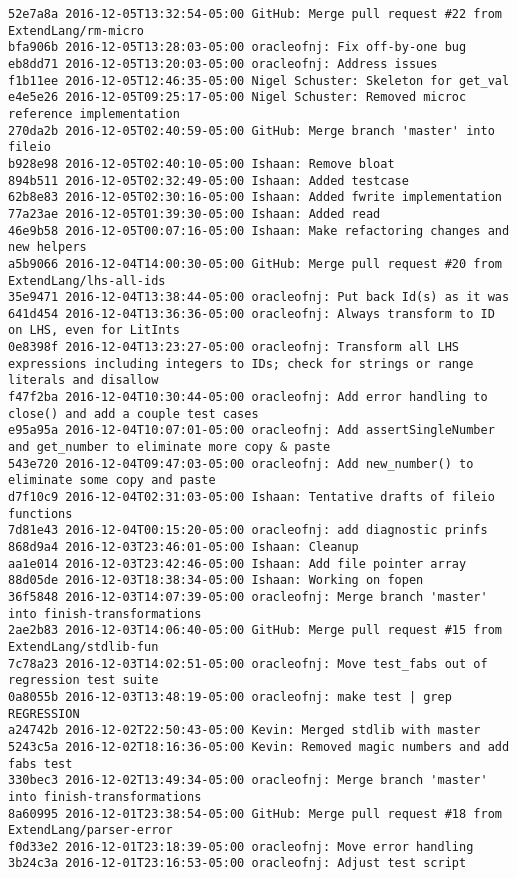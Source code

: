 \begin{lstlisting}
52e7a8a 2016-12-05T13:32:54-05:00 GitHub: Merge pull request #22 from ExtendLang/rm-micro
bfa906b 2016-12-05T13:28:03-05:00 oracleofnj: Fix off-by-one bug
eb8dd71 2016-12-05T13:20:03-05:00 oracleofnj: Address issues
f1b11ee 2016-12-05T12:46:35-05:00 Nigel Schuster: Skeleton for get_val
e4e5e26 2016-12-05T09:25:17-05:00 Nigel Schuster: Removed microc reference implementation
270da2b 2016-12-05T02:40:59-05:00 GitHub: Merge branch 'master' into fileio
b928e98 2016-12-05T02:40:10-05:00 Ishaan: Remove bloat
894b511 2016-12-05T02:32:49-05:00 Ishaan: Added testcase
62b8e83 2016-12-05T02:30:16-05:00 Ishaan: Added fwrite implementation
77a23ae 2016-12-05T01:39:30-05:00 Ishaan: Added read
46e9b58 2016-12-05T00:07:16-05:00 Ishaan: Make refactoring changes and new helpers
a5b9066 2016-12-04T14:00:30-05:00 GitHub: Merge pull request #20 from ExtendLang/lhs-all-ids
35e9471 2016-12-04T13:38:44-05:00 oracleofnj: Put back Id(s) as it was
641d454 2016-12-04T13:36:36-05:00 oracleofnj: Always transform to ID on LHS, even for LitInts
0e8398f 2016-12-04T13:23:27-05:00 oracleofnj: Transform all LHS expressions including integers to IDs; check for strings or range literals and disallow
f47f2ba 2016-12-04T10:30:44-05:00 oracleofnj: Add error handling to close() and add a couple test cases
e95a95a 2016-12-04T10:07:01-05:00 oracleofnj: Add assertSingleNumber and get_number to eliminate more copy & paste
543e720 2016-12-04T09:47:03-05:00 oracleofnj: Add new_number() to eliminate some copy and paste
d7f10c9 2016-12-04T02:31:03-05:00 Ishaan: Tentative drafts of fileio functions
7d81e43 2016-12-04T00:15:20-05:00 oracleofnj: add diagnostic prinfs
868d9a4 2016-12-03T23:46:01-05:00 Ishaan: Cleanup
aa1e014 2016-12-03T23:42:46-05:00 Ishaan: Add file pointer array
88d05de 2016-12-03T18:38:34-05:00 Ishaan: Working on fopen
36f5848 2016-12-03T14:07:39-05:00 oracleofnj: Merge branch 'master' into finish-transformations
2ae2b83 2016-12-03T14:06:40-05:00 GitHub: Merge pull request #15 from ExtendLang/stdlib-fun
7c78a23 2016-12-03T14:02:51-05:00 oracleofnj: Move test_fabs out of regression test suite
0a8055b 2016-12-03T13:48:19-05:00 oracleofnj: make test | grep REGRESSION
a24742b 2016-12-02T22:50:43-05:00 Kevin: Merged stdlib with master
5243c5a 2016-12-02T18:16:36-05:00 Kevin: Removed magic numbers and add fabs test
330bec3 2016-12-02T13:49:34-05:00 oracleofnj: Merge branch 'master' into finish-transformations
8a60995 2016-12-01T23:38:54-05:00 GitHub: Merge pull request #18 from ExtendLang/parser-error
f0d33e2 2016-12-01T23:18:39-05:00 oracleofnj: Move error handling
3b24c3a 2016-12-01T23:16:53-05:00 oracleofnj: Adjust test script

\end{lstlisting}
